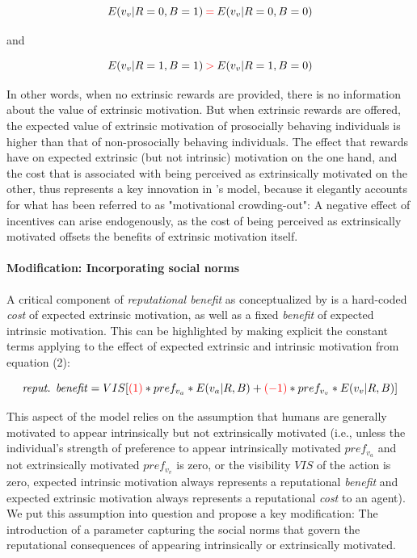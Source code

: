 \documentclass[AER]{AEA}
\begin{document}
\begin{equation} 
 E(v_{v} | R = 0, B = 1) \mathbin{\color{red}=} E(v_{v} | R = 0, B = 0)
\end{equation}
\centerline{and}
\begin{equation} 
 E(v_{v} | R = 1, B = 1) \mathbin{\color{red}>} E(v_{v} | R = 1, B = 0) 
\end{equation}


In other words, when no extrinsic rewards are provided, there is no information about the value of extrinsic motivation. But when extrinsic rewards are offered, the expected value of extrinsic motivation of prosocially behaving individuals is higher than that of non-prosocially behaving individuals. The effect that rewards have on expected extrinsic (but not intrinsic) motivation on the one hand, and the cost that is associated with being perceived as extrinsically motivated on the other, thus represents a key innovation in \citeauthor{benabou_incentives_2006}'s \citeyearpar{benabou_incentives_2006} model, because it elegantly accounts for what has been referred to as "motivational crowding-out": A negative effect of incentives can arise endogenously, as the cost of being perceived as extrinsically motivated offsets the benefits of extrinsic motivation itself.

\paragraph{Modification: Incorporating social norms}



A critical component of \textit{reputational benefit} as conceptualized by \cite{benabou_incentives_2006} is a hard-coded \textit{cost} of expected extrinsic motivation, as well as a fixed \textit{benefit} of expected intrinsic motivation. This can be highlighted by making explicit the constant terms applying to the effect of expected extrinsic and intrinsic motivation from equation (2):

\begin{equation} 
 \mbox{\textit{reput. benefit}} =  VIS[\mathbin{\color{red}(1)} * pref_{v_{a}} * E(v_{a} | R, B) + \mathbin{\color{red}(-1)} * pref_{v_{v}} * E(v_{v} | R, B)]
\end{equation}



This aspect of the model relies on the assumption that humans are generally motivated to appear intrinsically but not extrinsically motivated (i.e., unless the individual’s strength of preference to appear intrinsically motivated $pref_{v_{a}}$ and not extrinsically motivated $pref_{v_{v}}$ is zero, or the visibility $VIS$ of the action is zero, expected intrinsic motivation always represents a reputational \textit{benefit} and expected extrinsic motivation always represents a reputational \textit{cost} to an agent). We put this assumption into question and propose a key modification: The introduction of a parameter capturing the social norms that govern the reputational consequences of appearing intrinsically or extrinsically motivated.
\end{document}
